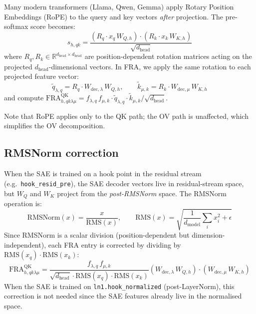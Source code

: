 \documentclass{article}
\theoremstyle{plain}
\theoremstyle{definition}
\theoremstyle{remark}
\newcommand{\WQ}{W_Q}
\newcommand{\WK}{W_K}
\newcommand{\dmodel}{d_{\mathrm{model}}}
\newcommand{\dhead}{d_{\mathrm{head}}}
\newcommand{\RR}{\mathbb{R}}
\begin{document}
Many modern transformers (Llama, Qwen, Gemma) apply Rotary Position Embeddings (RoPE) to the query and key vectors \emph{after} projection. The pre-softmax score becomes:
\begin{equation}
    s_{h,qk} = \frac{\left(R_q \cdot x_q\,W_{Q,h} \right) \cdot \left( R_k \cdot x_k\,W_{K,h} \right)}{\sqrt{\dhead}}
\end{equation}
where $R_q, R_k \in \RR^{\dhead \times \dhead}$ are position-dependent rotation matrices acting on the projected $\dhead$-dimensional vectors. In FRA, we apply the same rotation to each projected feature vector:
\begin{equation}
    \tilde{q}_{\lambda,q} = R_q \cdot W_{\mathrm{dec},\lambda}\,W_{Q,h}, \qquad \tilde{k}_{\mu,k} = R_k \cdot W_{\mathrm{dec},\mu}\,W_{K,h}
\end{equation}
and compute $\mathrm{FRA}^{\mathrm{QK}}_{h,qk\lambda\mu} = f_{\lambda,q} \, f_{\mu,k} \cdot \tilde{q}_{\lambda,q} \cdot \tilde{k}_{\mu,k} / \sqrt{\dhead}$.

Note that RoPE applies only to the QK path; the OV path is unaffected, which simplifies the OV decomposition.

\subsection{RMSNorm correction}
\label{app:rms}

When the SAE is trained on a hook point in the residual stream (e.g.\ \texttt{hook\_resid\_pre}), the SAE decoder vectors live in residual-stream space, but $\WQ$ and $\WK$ project from the \emph{post-RMSNorm} space. The RMSNorm operation is:
\begin{equation}
    \mathrm{RMSNorm}(x) = \frac{x}{\mathrm{RMS}(x)}, \qquad \mathrm{RMS}(x) = \sqrt{\frac{1}{\dmodel} \sum_i x_i^2 + \epsilon}
\end{equation}
Since RMSNorm is a scalar division (position-dependent but dimension-independent), each FRA entry is corrected by dividing by $\mathrm{RMS}(x_q) \cdot \mathrm{RMS}(x_k)$:
\begin{equation}
    \mathrm{FRA}^{\mathrm{QK}}_{h,qk\lambda\mu} = \frac{f_{\lambda,q} \, f_{\mu,k}}{\sqrt{\dhead} \cdot \mathrm{RMS}(x_q) \cdot \mathrm{RMS}(x_k)} \left( W_{\mathrm{dec},\lambda}\,W_{Q,h} \right) \cdot \left( W_{\mathrm{dec},\mu}\,W_{K,h} \right)
\end{equation}
When the SAE is trained on \texttt{ln1.hook\_normalized} (post-LayerNorm), this correction is not needed since the SAE features already live in the normalised space.
\end{document}
